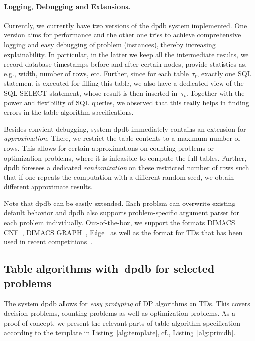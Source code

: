 \documentclass{llncs}
\newcommand{\dpdb}{{\small\textsf{dpdb}}\xspace}
\newcommand{\tab}[1]{\ensuremath{\tau_{#1}}}
\begin{document}
\paragraph*{Logging, Debugging and Extensions.} Currently, we currently have two versions of the \dpdb system implemented. 
One version aims for performance and the other one tries to achieve comprehensive logging and easy debugging of problem (instances), thereby increasing explainability.
In particular, in the latter we keep all the intermediate results, we record database timestamps before and after certain nodes, provide statistics as, e.g., width, number of rows, etc.
Further, since for each table~$\tab{t}$, exactly one SQL statement is executed for filling this table, we also have a dedicated view of the SQL {\ttfamily SELECT} statement, whose result is then inserted in~$\tab{t}$.
Together with the power and flexibility of SQL queries, we observed that this really helps in finding errors in the table algorithm specifications.

Besides convient debugging, system \dpdb immediately
contains an extension for \emph{approximation}.
There, we restrict the table contents to a maximum number of rows.
This allows for certain approximations on counting problems or
optimization problems, where it is infeasible to compute the full tables.
Further, \dpdb foresees a dedicated \emph{randomization} on these restricted number of rows
such that if one repeats the computation with a different random seed,
we obtain different approximate results.

Note that \dpdb can be easily extended. 
Each problem can overwrite existing default behavior and \dpdb also supports
problem-specific argument parser for each problem individually.
Out-of-the-box, we support the formats DIMACS CNF~\cite{}, DIMACS GRAPH~\cite{}, Edge~\cite{} as well as the format for TDs that has been used in recent competitions~\cite{}.


\subsection{Table algorithms with~\dpdb for selected problems}

The system \dpdb allows for \emph{easy protyping} of DP algorithms on TDs.
This covers decision problems, counting problems as well as optimization problems.
As a proof of concept, we present the relevant parts of table algorithm specification
according to the template in Listing~\ref{alg:template}, cf., Listing~\ref{alg:primdb}.
\end{document}
